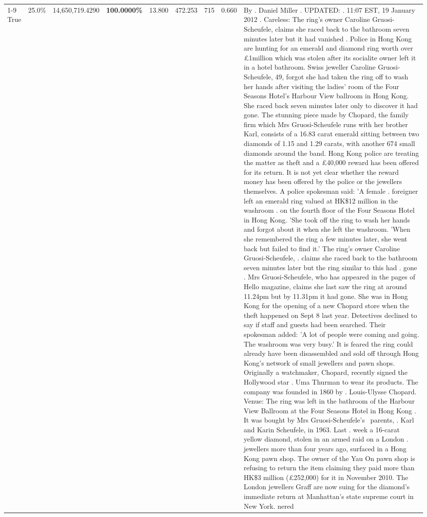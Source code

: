\begin{table}[H]
\begin{tabular}{lllrlllll}
\cline{1-9}
True & 25.0\% & 14,650,719.4290 & \bfseries \color{red} 100.0000\% & 13.800 & 472.253 & 715 & 0.660 & By . Daniel Miller . UPDATED: . 11:07 EST, 19 January 2012 . Careless: The ring's owner Caroline Gruosi-Scheufele, claims she raced back to the bathroom seven minutes later but it had vanished . Police in Hong Kong are hunting for an emerald and diamond ring worth over £1million which was stolen after its socialite owner left it in a hotel bathroom. Swiss jeweller Caroline Gruosi-Scheufele, 49, forgot she had taken the ring off to wash her hands after visiting the ladies' room of the Four Seasons Hotel's Harbour View ballroom in Hong Kong. She raced back seven minutes later only to discover it had gone. The stunning piece made by Chopard, the family firm which Mrs Gruosi-Scheufele runs with her brother Karl, consists of a 16.83 carat emerald sitting between two diamonds of 1.15 and 1.29 carats, with another 674 small diamonds around the band. Hong Kong police are treating the matter as theft and a £40,000 reward has been offered for its return. It is not yet clear whether the reward money has been offered by the police or the jewellers themselves. A police spokesman said: 'A female . foreigner left an emerald ring valued at HK\$12 million in the washroom . on the fourth floor of the Four Seasons Hotel in Hong Kong. 'She took off the ring to wash her hands and forgot about it when she left the washroom. 'When she remembered the ring a few minutes later, she went back but failed to find it.' The ring's owner Caroline Gruosi-Scheufele, . claims she raced back to the bathroom seven minutes later but the ring similar to this had . gone . Mrs Gruosi-Scheufele, who has appeared in the pages of Hello magazine, claims she last saw the ring at around 11.24pm but by 11.31pm it had gone. She was in Hong Kong for the opening of a new Chopard store when the theft happened on Sept 8 last year. Detectives declined to say if staff and guests had been searched. Their spokesman added: 'A lot of people were coming and going. The washroom was very busy.' It is feared the ring could already have been disassembled and sold off through Hong Kong's network of small jewellers and pawn shops. Originally a watchmaker, Chopard, recently signed the Hollywood star . Uma Thurman to wear its products. The company was founded in 1860 by . Louis-Ulysse Chopard. Venue: The ring was left in the bathroom of the Harbour View Ballroom at the Four Seasons Hotel in Hong Kong . It was bought by Mrs Gruosi-Scheufele's  parents, . Karl and Karin Scheufele, in 1963. Last . week a 16-carat yellow diamond, stolen in an armed raid on a London . jewellers more than four years ago, surfaced in a Hong Kong pawn shop. The owner of the Yau On pawn shop is refusing to return the item claiming they paid more than HK\$3 million (£252,000) for it in November 2010. The London jewellers Graff are now suing for the diamond’s immediate return at Manhattan’s state supreme court in New York. nered \\

\end{tabular}
\end{table}
